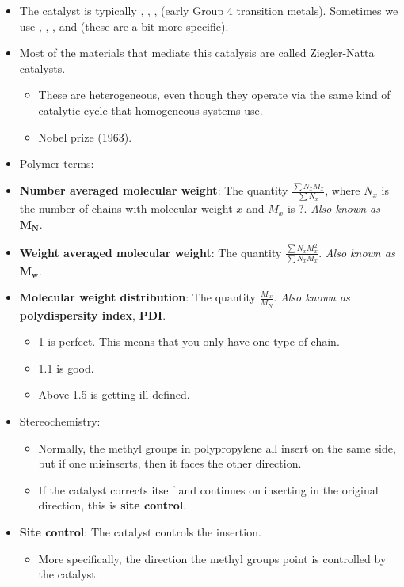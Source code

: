 \documentclass[../notes.tex]{subfiles}
\begin{document}
\begin{itemize}
    \item The catalyst is typically , , ,  (early Group 4 transition metals). Sometimes we use , , , and  (these are a bit more specific).
    \item Most of the materials that mediate this catalysis are called Ziegler-Natta catalysts.
    \begin{itemize}
        \item These are heterogeneous, even though they operate via the same kind of catalytic cycle that homogeneous systems use.
        \item Nobel prize (1963).
    \end{itemize}
    \item Polymer terms:
    \item \textbf{Number averaged molecular weight}: The quantity $\frac{\sum N_xM_x}{\sum N_x}$, where $N_x$ is the number of chains with molecular weight $x$ and $M_x$ is ?. \emph{Also known as} $\bm{M_N}$.
    \item \textbf{Weight averaged molecular weight}: The quantity $\frac{\sum N_xM_x^2}{\sum N_xM_x}$. \emph{Also known as} $\bm{M_w}$.
    \item \textbf{Molecular weight distribution}: The quantity $\frac{M_w}{M_N}$. \emph{Also known as} \textbf{polydispersity index}, \textbf{PDI}.
    \begin{itemize}
        \item 1 is perfect. This means that you only have one type of chain.
        \item 1.1 is good.
        \item Above 1.5 is getting ill-defined.
    \end{itemize}
    \item Stereochemistry:
    \begin{itemize}
        \item Normally, the methyl groups in polypropylene all insert on the same side, but if one misinserts, then it faces the other direction.
        \item If the catalyst corrects itself and continues on inserting in the original direction, this is \textbf{site control}.
    \end{itemize}
    \item \textbf{Site control}: The catalyst controls the insertion.
    \begin{itemize}
        \item More specifically, the direction the methyl groups point is controlled by the catalyst.

\end{itemize}
\end{itemize}
\end{document}
